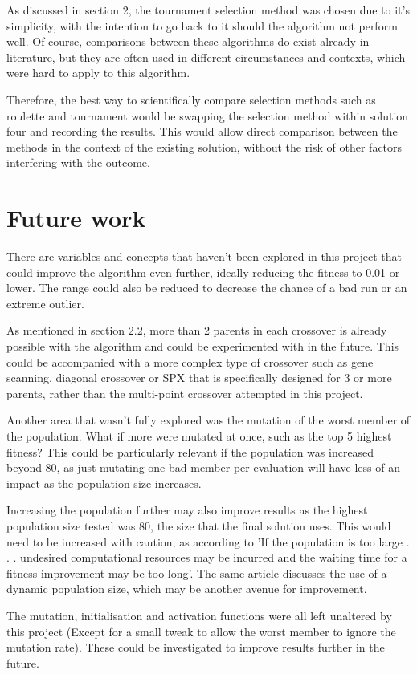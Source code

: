 \documentclass[sigconf]{acmart}
\begin{document}
As discussed in section 2, the tournament selection method was chosen due to it's simplicity, with the intention to go back to it should the algorithm not perform well. Of course, comparisons between these algorithms do exist already in literature, but they are often used in different circumstances and contexts, which were hard to apply to this algorithm. 

Therefore, the best way to scientifically compare selection methods such as roulette and tournament would be swapping the selection method within solution four and recording the results. This would allow direct comparison between the methods in the context of the existing solution, without the risk of other factors interfering with the outcome.
\section{Future work}
There are variables and concepts that haven't been explored in this project that could improve the algorithm even further, ideally reducing the fitness to 0.01 or lower. The range could also be reduced to decrease the chance of a bad run or an extreme outlier.

As mentioned in section 2.2, more than 2 parents in each crossover is already possible with the algorithm and could be experimented with in the future. This could be accompanied with a more complex type of crossover such as gene scanning, diagonal crossover \cite{multiParent2} or SPX \cite{multipleParents} that is specifically designed for 3 or more parents, rather than the multi-point crossover attempted in this project.

Another area that wasn't fully explored was the mutation of the worst member of the population. What if more were mutated at once, such as the top 5 highest fitness? This could be particularly relevant if the population was increased beyond 80, as just mutating one bad member per evaluation will have less of an impact as the population size increases.

Increasing the population further may also improve results as the highest population size tested was 80, the size that the final solution uses. This would need to be increased with caution, as according to \cite{popSize} 'If the population is too large . . . undesired computational resources may be incurred and the waiting time for a fitness improvement may be too long'. The same article discusses the use of a dynamic population size, which may be another avenue for improvement.

The mutation, initialisation and activation functions were all left unaltered by this project (Except for a small tweak to allow the worst member to ignore the mutation rate). These could be investigated to improve results further in the future.


 
\end{document}
